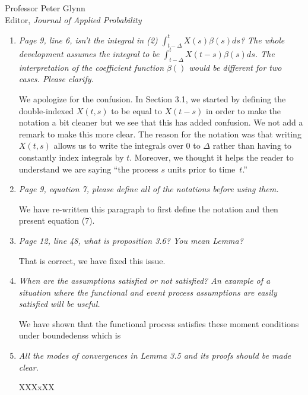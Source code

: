\documentclass[11pt]{letter} %
\begin{document}
\begin{letter}{Professor
	Peter Glynn\\
	Editor, {\em Journal of Applied Probability}}
\begin{enumerate}
\item {\it Page 9, line 6, isn’t the integral in (2) $\int_{t-\Delta}^t X(s) \beta(s)ds$? The whole development assumes the integral to be $\int_{t-\Delta}^t X(t-s) \beta(s)ds$. The interpretation of the coefficient function $\beta()$ would be different for two cases. Please clarify.}

\vspace{5mm}
We apologize for the confusion.  In Section 3.1, we started by defining the double-indexed $X(t,s)$ to be equal to $X(t-s)$ in order to make the notation a bit cleaner but we see that this has added confusion.  We not add a remark to make this more clear.  The reason for the notation was that writing $X(t,s)$ allows us to write the integrals over $0$ to $\Delta$ rather than having to constantly index integrals by $t$.  Moreover, we thought it helps the reader to understand we are saying ``the process $s$ units prior to time~$t$.''
\vspace{5mm}

\item {\it Page 9, equation 7, please define all of the notations before using them.}

\vspace{5mm}
We have re-written this paragraph to first define the notation and then present equation (7).
\vspace{5mm}

\item {\it Page 12, line 48, what is proposition 3.6? You mean Lemma?}

\vspace{5mm}
That is correct, we have fixed this issue.
\vspace{5mm}

\item {\it When are the assumptions satisfied or not satisfied? An example of a
situation where the functional and event process assumptions are easily satisfied will be useful.}

\vspace{5mm}
We have shown that the functional process satisfies these moment conditions under boundedenss which is
\vspace{5mm}

\item {\it All the modes of convergences in Lemma 3.5 and its proofs should be made clear.}

\vspace{5mm}
XXXxXX
\vspace{5mm}


\end{enumerate}
\end{letter}
\end{document}
